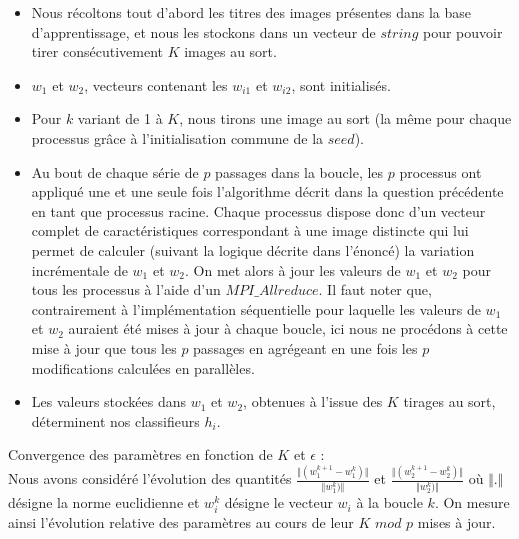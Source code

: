 \documentclass[a4paper,11pt]{article}
\begin{document}
\begin{itemize}
	\item Nous récoltons tout d’abord les titres des images présentes dans la base d’apprentissage, et nous les stockons dans un vecteur de $string$ pour pouvoir tirer consécutivement $K$ images au sort. \\
	\item  $w_1$ et $w_2$, vecteurs contenant les $w_{i1}$ et $w_{i2}$, sont initialisés.\\
	\item  Pour $k$ variant de 1 à $K$, nous tirons une image au sort (la même pour chaque processus grâce à l’initialisation commune de la $seed$).\\
	\item  Au bout de chaque série de $p$ passages dans la boucle, les $p$ processus ont appliqué une et une seule fois l’algorithme décrit dans la question précédente en tant que processus racine. Chaque processus dispose donc d’un vecteur complet de caractéristiques correspondant à une image distincte qui lui permet de calculer (suivant la logique décrite dans l’énoncé) la variation incrémentale de $w_1$ et $w_2$. On met alors à jour les valeurs de $w_1$ et $w_2$ pour tous les processus à l’aide d’un $MPI\_Allreduce$. Il faut noter que, contrairement à l'implémentation séquentielle pour laquelle les valeurs de $w_1$ et $w_2$ auraient été mises à jour à chaque boucle, ici nous ne procédons à cette mise à jour que tous les $p$ passages en agrégeant en une fois les $p$ modifications calculées en parallèles. \\
	\item  Les valeurs stockées dans $w_1$ et $w_2$, obtenues à l’issue des $K$ tirages au sort, déterminent nos classifieurs $h_i$.\\
		
\end{itemize}

Convergence des paramètres en fonction de $K$ et $\epsilon$ :\\
Nous avons considéré l'évolution des quantités $  \frac{\Vert(w_1^{k+1} - w_1^{k})\Vert}{\Vert w_1^{k})\Vert}$ et $  \frac{\Vert(w_2^{k+1} - w_2^{k})\Vert}{\Vert w_2^{k})\Vert}$ où $\Vert . \Vert$ désigne la norme euclidienne et $w_i^k$ désigne le vecteur $w_i$ à la boucle $k$. On mesure ainsi l'évolution relative des paramètres au cours de leur $K$ $mod$ $p$ mises à jour. 
\end{document}
